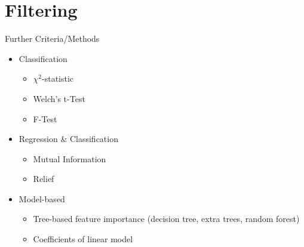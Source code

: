 \documentclass[11pt,compress,t,notes=noshow, xcolor=table]{beamer}
\begin{document}
\begin{frame}{}

\end{frame}

\section{Filtering}

\begin{frame}{}
 
\end{frame}

\begin{frame}{}
 
\end{frame}

\begin{frame}{}
 
\end{frame}

\begin{frame}{}
 
\end{frame}

\begin{frame}{Further Criteria/Methods}
    \begin{itemize}
        \item Classification
        \begin{itemize}
            \item $\chi^2$-statistic
            \item Welch's t-Test
            \item F-Test
            
        \end{itemize}
        \item Regression \& Classification
        \begin{itemize}
            \item Mutual Information
            \item Relief
        \end{itemize}
        \item Model-based
        \begin{itemize}
            \item Tree-based feature importance (decision tree, extra trees, random forest)
            \item Coefficients of linear model
        \end{itemize}
    \end{itemize}
\end{frame}
\end{document}
